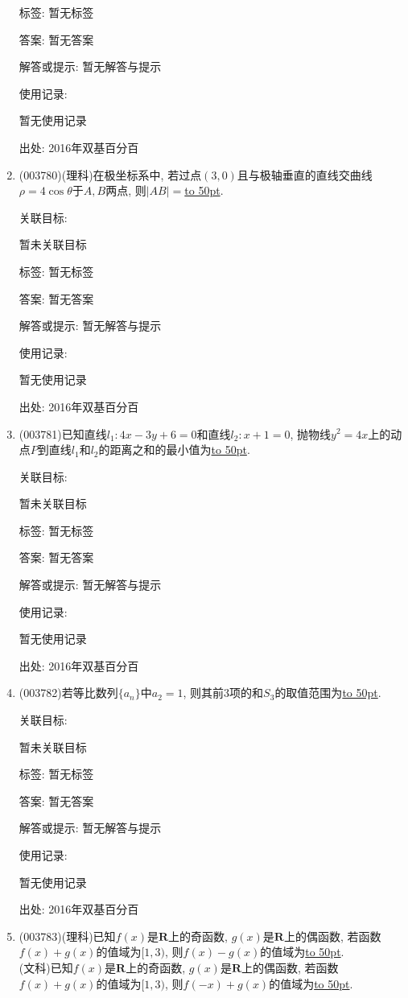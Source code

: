 \documentclass[10pt,a4paper]{article}
\newcommand{\blank}[1]{\underline{\hbox to #1pt{}}}
\begin{document}
\begin{enumerate}[1.]
标签: 暂无标签

答案: 暂无答案

解答或提示: 暂无解答与提示

使用记录:

暂无使用记录


出处: 2016年双基百分百
\item { (003780)}(理科)在极坐标系中, 若过点$(3,0)$且与极轴垂直的直线交曲线$\rho=4\cos\theta$于$A,B$两点, 则$|AB|=$\blank{50}.


关联目标:

暂未关联目标



标签: 暂无标签

答案: 暂无答案

解答或提示: 暂无解答与提示

使用记录:

暂无使用记录


出处: 2016年双基百分百
\item { (003781)}已知直线$l_1:4x-3y+6=0$和直线$l_2:x+1=0$, 抛物线$y^2=4x$上的动点$P$到直线$l_1$和$l_2$的距离之和的最小值为\blank{50}.


关联目标:

暂未关联目标



标签: 暂无标签

答案: 暂无答案

解答或提示: 暂无解答与提示

使用记录:

暂无使用记录


出处: 2016年双基百分百
\item { (003782)}若等比数列$\{a_n\}$中$a_2=1$, 则其前$3$项的和$S_3$的取值范围为\blank{50}.


关联目标:

暂未关联目标



标签: 暂无标签

答案: 暂无答案

解答或提示: 暂无解答与提示

使用记录:

暂无使用记录


出处: 2016年双基百分百
\item { (003783)}(理科)已知$f(x)$是$\mathbf{R}$上的奇函数, $g(x)$是$\mathbf{R}$上的偶函数, 若函数$f(x)+g(x)$的值域为$[1,3)$, 则$f(x)-g(x)$的值域为\blank{50}.\\
(文科)已知$f(x)$是$\mathbf{R}$上的奇函数, $g(x)$是$\mathbf{R}$上的偶函数, 若函数$f(x)+g(x)$的值域为$[1,3)$, 则$f(-x)+g(x)$的值域为\blank{50}.



\end{enumerate}
\end{document}
